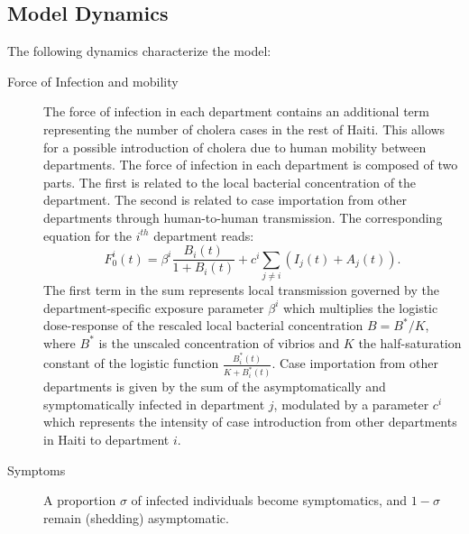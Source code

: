 \subsection{Model Dynamics} 
The following dynamics characterize the model:
\begin{description}

    \item[Force of Infection and mobility] The force of infection in each department contains an additional term representing the number of cholera cases in the rest of Haiti. This allows for a possible introduction of cholera due to  human mobility between departments. The force of infection in each department is composed of two parts. The first is related to the local bacterial concentration of the department. The second is related to case importation from other departments through human-to-human transmission. The corresponding equation for the $i^{th}$ department reads:
    \begin{equation*}
    F^i_0(t)=\beta^i\frac{B_i(t)}{1+B_i(t)}+c^i \sum_{j\ne i} (I_j(t)+A_j(t)).
    \end{equation*}
    The first term in the sum represents local transmission governed by the department-specific exposure parameter $\beta^i$ which multiplies the logistic dose-response of the rescaled local bacterial concentration $B = B^*/K$, where $B^*$ is the unscaled concentration of vibrios and $K$ the half-saturation constant of the logistic function $\frac{B^*_i(t)}{K+B^*_i(t)}$.
    Case importation from other departments is given by the sum of the asymptomatically and symptomatically infected in department $j$, modulated by a parameter $c^i$ which represents the intensity of case introduction from other departments in Haiti  to department $i$.
      \item[Symptoms] A proportion $\sigma$ of infected individuals become symptomatics, and $1-\sigma$ remain (shedding) asymptomatic. 

\end{description}
